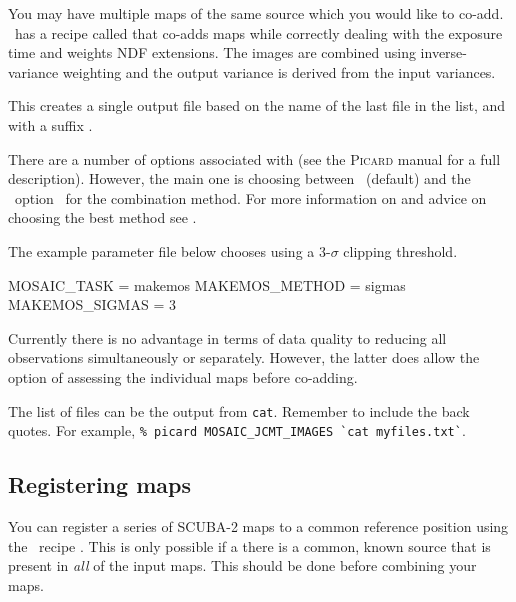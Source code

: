 You may have multiple maps of the same source which you would like to
co-add. \picard\ has a recipe called
that co-adds maps while correctly dealing with the exposure time and
weights NDF extensions. The images are combined using inverse-variance
weighting and the output variance is derived from the input variances.

\begin{terminalv}
\end{terminalv}

This creates a single output file based on the name of the last file
in the list, and with a suffix .

There are a number of options associated with
 (see the \textsc{Picard} manual for a full
description). However, the main one is choosing between \wcsmosaic\
(default) and the \ccdpack\ option \makemos\ for the combination
method. For more information on \task{makemos} and advice on choosing the
best method see \xref{\textbf{SUN/139}}{sun139}{}.

The example parameter file below chooses  using a 3-$\sigma$
clipping threshold.

\begin{terminalv}
MOSAIC_TASK = makemos
MAKEMOS_METHOD = sigmas
MAKEMOS_SIGMAS = 3
\end{terminalv}

Currently there is no advantage in terms of data quality to reducing
all observations simultaneously or separately. However, the latter
does allow the option of assessing the individual maps before co-adding.

\begin{tip}
  The list of files can be the output from \texttt{cat}. Remember
  to include the back quotes.  For example, \texttt{\% picard
    MOSAIC\_JCMT\_IMAGES \`{}cat myfiles.txt\`{}}.
\end{tip}


\subsection{Registering maps}

You can register a series of SCUBA-2 maps to a common reference
position using the \picard\ recipe
.
This is only possible if a there is a common, known source that is
present in \textit{all} of the input maps. This should be done before
combining your maps.


